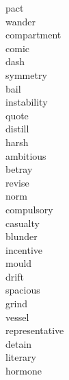 \documentclass[a4paper, 10pt]{ctexart}
\begin{document}
\begin{multicols*}{2}
\begin{description}
\item[pact]

\item[wander]

\item[compartment]

\item[comic]

\item[dash]

\item[symmetry]

\item[bail]

\item[instability]

\item[quote]

\item[distill]

\item[harsh]

\item[ambitious]

\item[betray]

\item[revise]

\item[norm]

\item[compulsory]

\item[casualty]

\item[blunder]

\item[incentive]

\item[mould]

\item[drift]

\item[spacious]

\item[grind]

\item[vessel]

\item[representative]

\item[detain]

\item[literary]

\item[hormone]


\end{description}
\end{multicols*}
\end{document}
